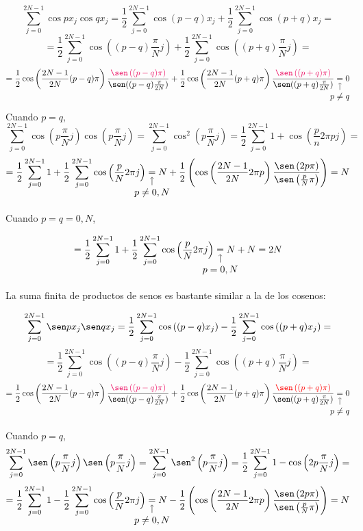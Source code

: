 \documentclass{article}
\newcommand{\nota}[3][2ex]{
    \underset{\mathclap{
        \begin{tikzpicture}
          \draw[->] (0, 0) to ++(0,#1);
          \node[below] at (0,0) {#3};
        \end{tikzpicture}}}{#2}
}
\begin{document}
$$
\sum_{j=0}^{2N-1} \cos px_j \cos qx_j = 
\frac{1}{2}\sum_{j=0}^{2N-1} \cos{(p-q)x_j} + \frac{1}{2}\sum_{j=0}^{2N-1} \cos{(p+q)x_j} =
$$
$$
=\frac{1}{2}\sum_{j=0}^{2N-1} \cos \left((p-q)\frac{\pi}{N}j\right) +\frac{1}{2} \sum_{j=0}^{2N-1} \cos\left((p+q)\frac{\pi}{N}j\right) =
$$
$$
=\frac{1}{2} \cos\left(\frac{2N-1}{2N}(p-q)\pi\right) \frac{\textcolor{WildStrawberry}{\sen\left((p-q)\pi\right)}}{\sen((p-q)\frac{\pi}{2N})} + \frac{1}{2}
\cos\left(\frac{2N-1}{2N}(p+q)\pi\right) \frac{\textcolor{WildStrawberry}{\sen\left((p+q)\pi\right)}}{\sen((p+q)\frac{\pi}{2N})}
\nota{=}{$p\ne q$} 0
$$
\noindent Cuando $p=q$,
$$
\sum_{j=0}^{2N-1} \cos\left(p\frac{\pi}{N}j\right) \cos\left(p\frac{\pi}{N}j\right) = \sum_{j=0}^{2N-1} \cos^2\left(p\frac{\pi}{N}j\right) =
\frac{1}{2} \sum_{j=0}^{2N-1} 1 + \cos\left(\frac{p}{n}2\pi pj\right) =
$$
$$
=\frac{1}{2} \sum_{j=0}^{2N-1} 1 + \frac{1}{2} \sum_{j=0}^{2N-1} \cos \left( \frac{p}{N} 2\pi j \right)
\nota{=}{$p \ne 0,N$}
N + \frac{1}{2}\left( \cos\left( \frac{2N-1}{2N} 2\pi p \right) \frac{\sen \left(2p \pi \right)}{\sen\left(\frac{p}{N}\pi \right)} \right)
= N
$$

\noindent Cuando $p=q=0,N$,


$$
=\frac{1}{2} \sum_{j=0}^{2N-1} 1 + \frac{1}{2} \sum_{j=0}^{2N-1} \cos \left( \frac{p}{N} 2\pi j \right)
\nota{=}{$p = 0,N$}
N + N = 2N
$$

\noindent La suma finita de productos de senos es bastante similar a la de los cosenos:

$$
\sum_{j=0}^{2N-1} \sen px_j \sen qx_j = 
\frac{1}{2}\sum_{j=0}^{2N-1} \cos{\left((p-q)x_j\right)} - \frac{1}{2}\sum_{j=0}^{2N-1} \cos{\left((p+q)x_j\right)} =
$$
$$
=\frac{1}{2}\sum_{j=0}^{2N-1} \cos \left((p-q)\frac{\pi}{N}j\right) - \frac{1}{2} \sum_{j=0}^{2N-1} \cos\left((p+q)\frac{\pi}{N}j\right) =
$$
$$
=\frac{1}{2} \cos\left(\frac{2N-1}{2N}(p-q)\pi\right) \frac{\textcolor{WildStrawberry}{\sen\left((p-q)\pi\right)}}{\sen((p-q)\frac{\pi}{2N})} + \frac{1}{2}
\cos\left(\frac{2N-1}{2N}(p+q)\pi\right) \frac{\textcolor{red}{\sen\left((p+q)\pi\right)}}{\sen((p+q)\frac{\pi}{2N})}
\nota{=}{$p\ne q$} 0
$$

\noindent Cuando $p=q$,
$$
\sum_{j=0}^{2N-1} \sen\left(p\frac{\pi}{N}j\right) \sen\left(p\frac{\pi}{N}j\right) = \sum_{j=0}^{2N-1} \sen^2\left(p\frac{\pi}{N}j\right) =
\frac{1}{2} \sum_{j=0}^{2N-1} 1 - \cos\left(2p\frac{\pi}{N}j\right) =
$$
$$
=\frac{1}{2} \sum_{j=0}^{2N-1} 1 - \frac{1}{2} \sum_{j=0}^{2N-1} \cos \left( \frac{p}{N} 2\pi j \right)
\nota{=}{$p \ne 0,N$}
N - \frac{1}{2}\left( \cos\left( \frac{2N-1}{2N} 2\pi p \right) \frac{\sen \left(2p \pi \right)}{\sen\left(\frac{p}{N}\pi \right)} \right)
= N
$$
\end{document}
